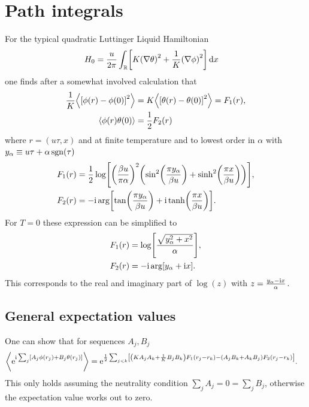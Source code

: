 \documentclass[english, parskip=full]{scrartcl}
\begin{document}
\section{Path integrals}
For the typical quadratic Luttinger Liquid Hamiltonian
\begin{align}
H_0 &= \frac{u}{2\pi} \intr{\klb*{K\kla*{\nabla\theta}^2 + \frac{1}{K} \kla*{\nabla\phi}^2} }{x}
\end{align}
one finds after a somewhat involved calculation that
\begin{align}
\frac{1}{K} \bra*{\klb*{\phi(r) - \phi(0)}^2} &= K \bra*{\klb*{\theta(r) - \theta(0)}^2} =  F_1(r),\\
\bra*{\phi(r)\theta(0)} &= \frac{1}{2} F_2(r)
\end{align}
where $r=(u\tau,x)$ and at finite temperature and to lowest order in $\alpha$ with $y_\alpha \equiv u\tau + \alpha\sgn(\tau)$
\begin{align}
F_1(r) &= \frac{1}{2} \log \klb*{\kla*{\frac{\beta u}{\pi\alpha}}^2 \kla*{\sin^2\kla*{\frac{\pi y_\alpha}{\beta u}} + \sinh^2\kla*{\frac{\pi x}{\beta u}} }}, \label{eqn:F1r}\\
F_2(r) &= -\i\arg\klb*{\tan\kla*{\frac{\pi y_\alpha}{\beta u}} + \i\tanh \kla*{\frac{\pi x}{\beta u}}}.\label{eqn:F2r}
\end{align}
For $T=0$ these expression can be simplified to
\begin{align}
F_1(r) &= \log \klb*{\frac{\sqrt{y_\alpha^2 + x^2}}{\alpha}},\label{eqn:F1r_T0}\\
F_2(r) &= -\i\arg \klb*{y_\alpha + \i x} \label{eqn:F2r_T0}.
\end{align}
This corresponds to the real and imaginary part of $\log(z)$ with $z=\frac{y_\alpha - \i x}{\alpha}$.
\subsection{General expectation values}
One can show that for sequences $A_j,B_j$
\begin{align}
\bra*{\powe{\i \sum_j \klb*{A_j\phi(r_j) + B_j\theta(r_j)}}} &= \powe{\frac{1}{2} \sum_{j<k} \klb*{\kla*{KA_jA_k + \frac{1}{K}B_jB_k} F_1(r_j-r_k) - (A_jB_k + A_kB_j) F_2(r_j-r_k)}} \label{eqn:expval_Aphi_Btheta_sum}.
\end{align}
This only holds assuming the neutrality condition $\sum_jA_j = 0 = \sum_jB_j$, otherwise the expectation value works out to zero.





\end{document}
